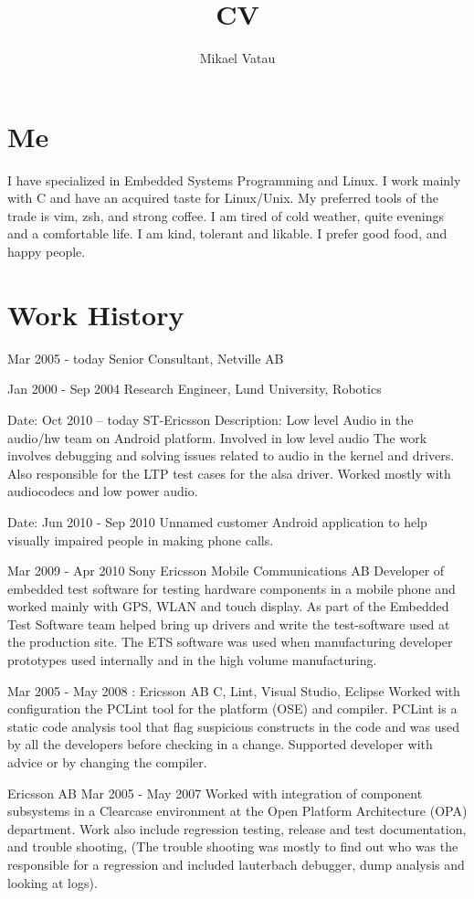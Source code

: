 \documentclass[a4paper]{article}
\author{Mikael Vatau}
\title{CV}
\begin{document}
\section{Me}
I have specialized in Embedded Systems Programming and Linux. I work mainly with C and have an acquired taste for Linux/Unix. My preferred tools of the trade is vim, zsh, and strong coffee. I am tired of cold weather, quite evenings and a comfortable life. I am kind, tolerant and likable. I prefer good food, and happy people. 

\section{Work History}
Mar 2005 - today
Senior Consultant, Netville AB

Jan 2000 - Sep 2004
Research Engineer, Lund University, Robotics




Date: 	Oct 2010 – today
ST-Ericsson
Description: 	Low level Audio in the audio/hw team on Android platform. Involved in low level audio  The work involves debugging and solving issues related to audio in the kernel and drivers. Also responsible for the LTP test cases for the alsa driver. Worked mostly with audiocodecs and low power audio.

Date: 	Jun 2010 - Sep 2010
Unnamed customer
Android application to help visually impaired people in making phone calls. 

 
Mar 2009 - Apr 2010
Sony Ericsson Mobile Communications AB		
Developer of embedded test software for testing hardware components in a mobile phone and worked mainly with GPS, WLAN and touch display. As part of the Embedded Test Software team helped bring up drivers and write the test-software used at the production site. The ETS software was used  when manufacturing developer prototypes used internally and in the high volume manufacturing.
 
Mar 2005 - May 2008	: 
Ericsson AB	
C, Lint, Visual Studio, Eclipse
Worked with configuration the PCLint tool for the platform (OSE) and compiler. PCLint is a static code analysis tool that flag suspicious constructs in the code and was used by all the developers before checking in a change. Supported developer with advice or by changing the compiler.

Ericsson AB	Mar 2005 - May 2007	
Worked with integration of component subsystems in a Clearcase environment at the Open Platform Architecture (OPA) department. Work also include regression testing, release and test documentation, and trouble shooting, (The trouble shooting was mostly to find out who was the responsible for a regression and included lauterbach debugger, dump analysis and looking at logs). 
\end{document}
